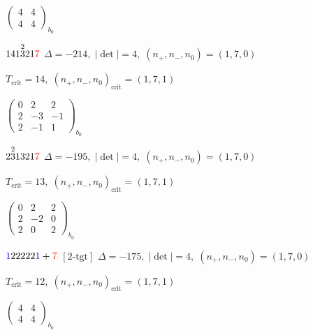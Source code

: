 \documentclass[10pt]{article}
\begin{document}
\hspace{2em}$\left(\begin{smallmatrix}4 & 4 \\ 4 & 4\end{smallmatrix}\right)_{\!b_0}$

\smallskip

$141\overset{2}{3}21\textcolor{red}{7}$ \quad $\Delta=-214,\; |\det|=4,\; (n_+,n_-,n_0)=(1,7,0)$

\hspace{1em}$T_{\text{crit}}=14,\; (n_+,n_-,n_0)_{\text{crit}}=(1,7,1)$

\hspace{2em}$\left(\begin{smallmatrix}0 & 2 & 2 \\ 2 & -3 & -1 \\ 2 & -1 & 1\end{smallmatrix}\right)_{\!b_0}$

\smallskip

$2\overset{2}{3}1321\textcolor{red}{7}$ \quad $\Delta=-195,\; |\det|=4,\; (n_+,n_-,n_0)=(1,7,0)$

\hspace{1em}$T_{\text{crit}}=13,\; (n_+,n_-,n_0)_{\text{crit}}=(1,7,1)$

\hspace{2em}$\left(\begin{smallmatrix}0 & 2 & 2 \\ 2 & -2 & 0 \\ 2 & 0 & 2\end{smallmatrix}\right)_{\!b_0}$

\smallskip

$\textcolor{blue}{1}22222\textcolor{blue}{1}+\textcolor{red}{7}$ $\scriptstyle [2\text{-tgt}]$ \quad $\Delta=-175,\; |\det|=4,\; (n_+,n_-,n_0)=(1,7,0)$

\hspace{1em}$T_{\text{crit}}=12,\; (n_+,n_-,n_0)_{\text{crit}}=(1,7,1)$

\hspace{2em}$\left(\begin{smallmatrix}4 & 4 \\ 4 & 4\end{smallmatrix}\right)_{\!b_0}$

\smallskip
\end{document}
